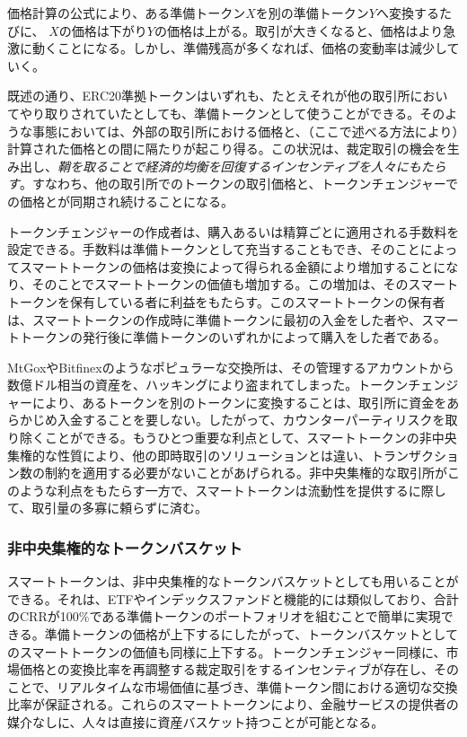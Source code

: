 \documentclass{jsarticle}
\begin{document}
    価格計算の公式により、ある準備トークン$X$を別の準備トークン$Y$へ変換するたびに、 $X$の価格は下がり$Y$の価格は上がる。取引が大きくなると、価格はより急激に動くことになる。しかし、準備残高が多くなれば、価格の変動率は減少していく。

    既述の通り、ERC20準拠トークンはいずれも、たとえそれが他の取引所においてやり取りされていたとしても、準備トークンとして使うことができる。そのような事態においては、外部の取引所における価格と、（ここで述べる方法により）計算された価格との間に隔たりが起こり得る。この状況は、裁定取引の機会を生み出し、\emph{鞘を取ることで経済的均衡を回復するインセンティブを人々にもたらす}。すなわち、他の取引所でのトークンの取引価格と、トークンチェンジャーでの価格とが同期され続けることになる。

    トークンチェンジャーの作成者は、購入あるいは精算ごとに適用される手数料を設定できる。手数料は準備トークンとして充当することもでき、そのことによってスマートトークンの価格は変換によって得られる金額により増加することになり、そのことでスマートトークンの価値も増加する。この増加は、そのスマートトークンを保有している者に利益をもたらす。このスマートトークンの保有者は、スマートトークンの作成時に準備トークンに最初の入金をした者や、スマートトークンの発行後に準備トークンのいずれかによって購入をした者である。

    MtGoxやBitfinexのようなポピュラーな交換所は、その管理するアカウントから数億ドル相当の資産を、ハッキングにより盗まれてしまった。トークンチェンジャーにより、あるトークンを別のトークンに変換することは、取引所に資金をあらかじめ入金することを要しない。したがって、カウンターパーティリスクを取り除くことができる。もうひとつ重要な利点として、スマートトークンの非中央集権的な性質により、他の即時取引のソリューションとは違い、トランザクション数の制約を適用する必要がないことがあげられる。非中央集権的な取引所がこのような利点をもたらす一方で、スマートトークンは流動性を提供するに際して、取引量の多寡に頼らずに済む。

    \subsubsection{非中央集権的なトークンバスケット}

    スマートトークンは、非中央集権的なトークンバスケットとしても用いることができる。それは、ETFやインデックスファンドと機能的には類似しており、合計のCRRが100\%である準備トークンのポートフォリオを組むことで簡単に実現できる。準備トークンの価格が上下するにしたがって、トークンバスケットとしてのスマートトークンの価値も同様に上下する。トークンチェンジャー同様に、市場価格との変換比率を再調整する裁定取引をするインセンティブが存在し、そのことで、リアルタイムな市場価値に基づき、準備トークン間における適切な交換比率が保証される。これらのスマートトークンにより、金融サービスの提供者の媒介なしに、人々は直接に資産バスケット持つことが可能となる。
\end{document}

